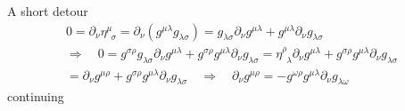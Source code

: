\documentclass[12pt]{article}
\def\nn{\nonumber}
\begin{document}
A short detour
\begin{gather}
0
=
\partial_{\nu}\eta^{\mu}_{\,\,\, \sigma}
=
\partial_{\nu}(g^{\mu \lambda}g_{\lambda\sigma})
=
g_{\lambda \sigma}
\partial_{\nu}
g^{\mu \lambda}
+
g^{\mu \lambda}
\partial_{\nu}
g_{\lambda \sigma}
\nn \\
\Rightarrow
\quad
0
=
g^{\sigma \rho}
g_{\lambda \sigma}
\partial_{\nu}
g^{\mu \lambda}
+
g^{\sigma \rho}
g^{\mu \lambda}
\partial_{\nu}
g_{\lambda \sigma}
=
\eta^{\rho}_{\,\,\, \lambda}
\partial_{\nu}
g^{\mu \lambda}
+
g^{\sigma \rho}
g^{\mu \lambda}
\partial_{\nu}
g_{\lambda \sigma}
\nn \\
=
\partial_{\nu}
g^{\mu \rho}
+
g^{\sigma \rho}
g^{\mu \lambda}
\partial_{\nu}
g_{\lambda \sigma}
\quad
\Rightarrow
\quad
\partial_{\nu}
g^{\mu \rho}
=-
g^{\omega \rho}
g^{\mu \lambda}
\partial_{\nu}
g_{\lambda \omega}
\end{gather}
continuing
\end{document}
